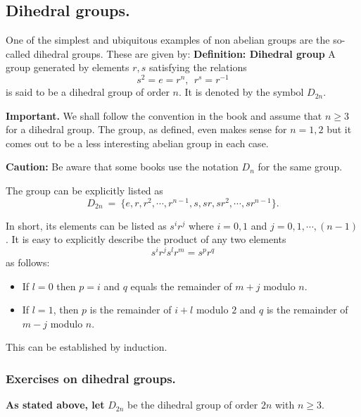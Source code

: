 \documentclass[12pt]{article}
\newcommand{\deff}[1]{{\bf Definition: #1} }
\begin{document}
\subsection{Dihedral groups.}
One of the simplest and ubiquitous examples of non abelian groups are
the so-called dihedral groups.
These are given by:
\deff{Dihedral group}
A group generated by elements $r,s$ satisfying the relations 
$$s^2=e=r^n,~~ r^s=r^{-1}$$
is said to be a dihedral group of order $n$.
It is denoted by the symbol $D_{2n}$.

{\bf Important.} We shall follow the convention in the book and assume
that $n\geq 3$ for a dihedral group.
The group, as defined, even makes sense for $n=1,2$ but it comes out to
be a less interesting abelian group in each case. 

{\bf Caution:} Be aware that some books use the notation $D_n$ for the
same group.

The group can be explicitly listed as 
$$D_{2n} ~=~ \{ e,r,r^2,\cdots,r^{n-1},s,sr,sr^2,\cdots,sr^{n-1}\}.$$

In short, its elements can be listed as $s^ir^j$ where $i=0,1$ and
$j=0,1,\cdots,(n-1)$.
It is easy to explicitly describe the product of any two elements 
$$s^ir^js^lr^m = s^pr^q$$
as follows:
\begin{itemize}
\item If $l=0$ then $p=i$ and $q$ equals the remainder of $m+j$ modulo
$n$.
\item If $l=1$, then $p$ is the remainder of $i+l$ modulo $2$ and $q$ is
the remainder of $m-j$ modulo $n$.
\end{itemize}

This can be established by induction.

\subsubsection{Exercises on dihedral groups.}
{\bf As stated above, let} $D_{2n}$ be the dihedral group of order $2n$ with
$n\geq 3$.
\end{document}
